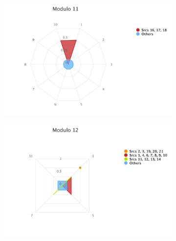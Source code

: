 \begin{figure}[ht]
\begin{adjustbox}{minipage=\linewidth,scale=0.8}
\begin{subfigure}{0.45\textwidth}
	\includegraphics[width=\linewidth]{tex/images/analysis/mod11}
\end{subfigure}
\hfill
\begin{subfigure}{0.45\textwidth}
	\includegraphics[width=\linewidth]{tex/images/analysis/mod12}
\end{subfigure}\\


\end{adjustbox}
\end{figure}
